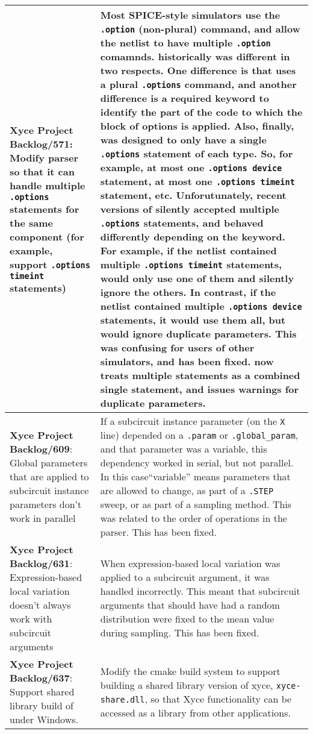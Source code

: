 {\begin{longtable}[h] {>{\raggedright\small}m{2in}|>{\raggedright\let\\\tabularnewline\small}m{3.5in}}
  \textbf{Xyce Project Backlog/571}: Modify \Xyce{} parser so that it can handle multiple \texttt{.options} statements for the same component (for example, support \texttt{.options timeint} statements) 
  &  Most SPICE-style simulators use the \texttt{.option} (non-plural) command, and allow the netlist to have multiple \texttt{.option} comamnds.   \Xyce{} historically was different in two respects.  One difference is that \Xyce{} uses a plural \texttt{.options} command, and another difference is a required keyword to identify the part of the code to which the block of options is applied.  Also, finally, \Xyce{} was designed to only have a single \texttt{.options} statement of each type.  So, for example, at most one \texttt{.options device} statement, at most one \texttt{.options timeint} statement, etc.  Unforutunately, recent versions of \Xyce{} silently accepted multiple \texttt{.options} statements, and behaved differently depending on the keyword.  For example, if the netlist contained multiple \texttt{.options timeint} statements, \Xyce{} would only use one of them and silently ignore the others.  In contrast, if the netlist contained multiple \texttt{.options device} statements, it would use them all, but would ignore duplicate parameters.  This was confusing for users of other simulators, and has been fixed.  \Xyce{} now treats multiple statements as a combined single statement, and issues warnings for duplicate parameters.
  \\\hline
 
 \textbf{Xyce Project Backlog/609}: 
  Global parameters that are applied to subcircuit instance parameters don't work in parallel
  & 
  If a subcircuit instance parameter (on the \texttt{X} line) depended on a \texttt{.param} or \texttt{.global\_param}, 
  and that parameter was a variable, this dependency worked in serial, but not parallel.    In this case``variable'' means 
  parameters that are allowed to change, as part of a \texttt{.STEP} sweep, or as part of a sampling method.
  This was related to the order of operations in the parser.  This has been fixed.  \\ \hline

 \textbf{Xyce Project Backlog/631}: 
  Expression-based local variation doesn't always work with subcircuit arguments & 
  When expression-based local variation was applied to a subcircuit argument, it 
  was handled incorrectly.  This meant that subcircuit arguments that should have 
  had a random distribution were fixed to the mean value during sampling.  
  This has been fixed.  \\ \hline

  \textbf{Xyce Project Backlog/637}: Support shared library build of \Xyce{} under Windows.
  &  Modify the cmake build system to support building a shared library version of xyce, \texttt{xyce-share.dll}, so that 
  Xyce functionality can be accessed as a library from other applications.
  \\\hline


\end{longtable}
}

